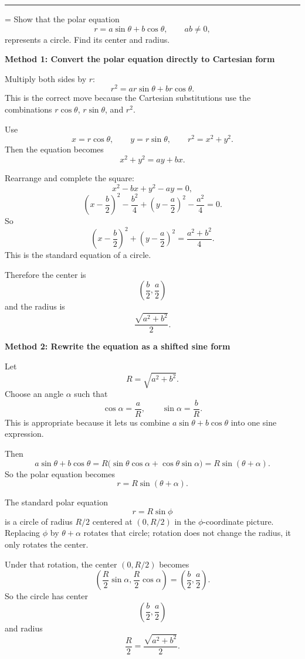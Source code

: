 \documentclass[a4paper,12pt,twocolumn]{article}
\newlength{\problemnumberwidth}
\newenvironment{solutionbox}{\begin{framed}}{\end{framed}}
\newcommand{\sectiontitle}[2]{%
  \hypertarget{#1}{}%
  \par\vspace{0.8em}%
  \noindent{\Large\bfseries #2}\par
  \vspace{0.3em}%
  \hrule
  \vspace{0.8em}%
}
\newcommand{\problem}[3]{%
  \Needspace{10\baselineskip}%
  \phantomsection\label{#1}%
  \par\vspace{0.8em}%
  \noindent
  \hangindent=\problemnumberwidth
  \hangafter=1
  \makebox[\problemnumberwidth][l]{\textbf{#2.}}#3\par
}
\begin{document}
\sectiontitle{sec:10-3}{10-3}

\problem{prob:10-3-57}{57}{Show that the polar equation
\[
r=a\sin\theta+b\cos\theta,\qquad ab\ne 0,
\]
represents a circle. Find its center and radius.}

\begin{solutionbox}
\textbf{Method 1: Convert the polar equation directly to Cartesian form}

\begin{steps}
\item Multiply both sides by \(r\):
\[
r^2=ar\sin\theta+br\cos\theta.
\]
This is the correct move because the Cartesian substitutions use the combinations \(r\cos\theta\), \(r\sin\theta\), and \(r^2\).

\item Use
\[
x=r\cos\theta,\qquad y=r\sin\theta,\qquad r^2=x^2+y^2.
\]
Then the equation becomes
\[
x^2+y^2=ay+bx.
\]

\item Rearrange and complete the square:
\[
x^2-bx+y^2-ay=0,
\]
\[
\left(x-\frac{b}{2}\right)^2-\frac{b^2}{4}
+\left(y-\frac{a}{2}\right)^2-\frac{a^2}{4}=0.
\]
So
\[
\left(x-\frac{b}{2}\right)^2+\left(y-\frac{a}{2}\right)^2
=\frac{a^2+b^2}{4}.
\]
This is the standard equation of a circle.

\item Therefore the center is
\[
\left(\frac{b}{2},\frac{a}{2}\right)
\]
and the radius is
\[
\frac{\sqrt{a^2+b^2}}{2}.
\]
\end{steps}
\end{solutionbox}

\begin{solutionbox}
\textbf{Method 2: Rewrite the equation as a shifted sine form}

\begin{steps}
\item Let
\[
R=\sqrt{a^2+b^2}.
\]
Choose an angle \(\alpha\) such that
\[
\cos\alpha=\frac{a}{R},
\qquad
\sin\alpha=\frac{b}{R}.
\]
This is appropriate because it lets us combine \(a\sin\theta+b\cos\theta\) into one sine expression.

\item Then
\[
a\sin\theta+b\cos\theta
=R\bigl(\sin\theta\cos\alpha+\cos\theta\sin\alpha\bigr)
=R\sin(\theta+\alpha).
\]
So the polar equation becomes
\[
r=R\sin(\theta+\alpha).
\]

\item The standard polar equation
\[
r=R\sin\phi
\]
is a circle of radius \(R/2\) centered at \((0,R/2)\) in the \(\phi\)-coordinate picture. Replacing \(\phi\) by \(\theta+\alpha\) rotates that circle; rotation does not change the radius, it only rotates the center.

\item Under that rotation, the center \((0,R/2)\) becomes
\[
\left(\frac{R}{2}\sin\alpha,\frac{R}{2}\cos\alpha\right)
=\left(\frac{b}{2},\frac{a}{2}\right).
\]
So the circle has center
\[
\left(\frac{b}{2},\frac{a}{2}\right)
\]
and radius
\[
\frac{R}{2}=\frac{\sqrt{a^2+b^2}}{2}.
\]
\end{steps}
\end{solutionbox}
\end{document}
